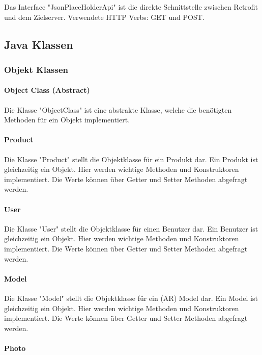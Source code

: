 \documentclass{scrartcl}
\begin{document}
Das Interface "JsonPlaceHolderApi" ist die direkte Schnittstelle zwischen Retrofit und dem Zielserver. Verwendete HTTP Verbs: GET und POST.

\subsection{Java Klassen}

\subsubsection{Objekt Klassen}

\paragraph{Object Class (Abstract)}

Die Klasse "ObjectClass" ist eine abstrakte Klasse, welche die benötigten Methoden für ein Objekt implementiert.

\paragraph{Product}

Die Klasse "Product" stellt die Objektklasse für ein Produkt dar. Ein Produkt ist gleichzeitig ein Objekt. Hier werden wichtige Methoden und Konstruktoren implementiert. Die Werte können über Getter und Setter Methoden abgefragt werden.

\paragraph{User}

Die Klasse "User" stellt die Objektklasse für einen Benutzer dar. Ein Benutzer ist gleichzeitig ein Objekt. Hier werden wichtige Methoden und Konstruktoren implementiert. Die Werte können über Getter und Setter Methoden abgefragt werden.

\paragraph{Model}

Die Klasse "Model" stellt die Objektklasse für ein (AR) Model dar. Ein Model ist gleichzeitig ein Objekt. Hier werden wichtige Methoden und Konstruktoren implementiert. Die Werte können über Getter und Setter Methoden abgefragt werden.

\paragraph{Photo}
\end{document}
